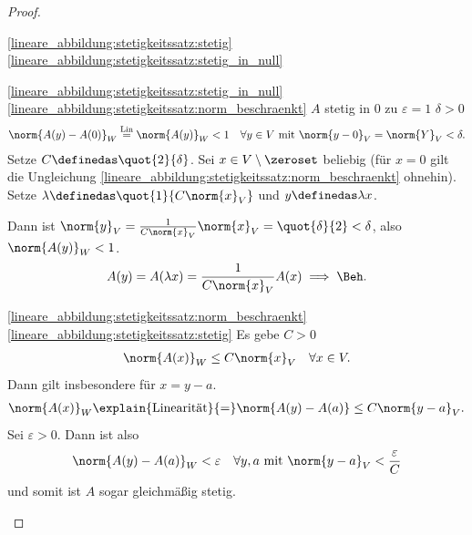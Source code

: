 \begin{proof}
    \begin{proofdescription}
        \item[\ref{lineare_abbildung:stetigkeitssatz:stetig} \timplies \ref{lineare_abbildung:stetigkeitssatz:stetig_in_null}] \checkmark
        \item[\ref{lineare_abbildung:stetigkeitssatz:stetig_in_null} \timplies \ref{lineare_abbildung:stetigkeitssatz:norm_beschraenkt}] \( A \) stetig in \( 0 \) \timplies zu \( \varepsilon=1 \) \texists \( \delta>0 \) \sd
        \begin{align*}
            \norm{A(y)-A(0)}_{W}\overset{\text{Lin}}{=}\norm{A(y)}_{W}<1\quad \forall y\in V \text{ mit }\norm{y-0}_{V}=\norm{Y}_V<\delta.
        \end{align*} 
        Setze \( C\definedas \quot{2}{\delta} \).
        Sei \( x\in V\setminus \zeroset \) beliebig (für \( x=0 \) gilt die Ungleichung \ref{lineare_abbildung:stetigkeitssatz:norm_beschraenkt} ohnehin).
        Setze \( \lambda\definedas \quot{1}{C\norm{x}_{V}} \) und \( y\definedas \lambda x \).
        
        Dann ist \( \norm{y}_V=\frac{1}{C\norm{x}_V}\norm{x}_V=\quot{\delta}{2}<\delta \), also \( \norm{A(y)}_W<1 \).
        \begin{align*}
            A(y)=A(\lambda x)=\frac{1}{C\norm{x}_V}A(x)\implies \Beh.
        \end{align*}
        \item[\ref{lineare_abbildung:stetigkeitssatz:norm_beschraenkt}\timplies \ref{lineare_abbildung:stetigkeitssatz:stetig}] Es gebe \( C>0 \) \sd
        \begin{align*}
            \norm{A(x)}_{W}\leq C\norm{x}_V \quad \forall x\in V.
        \end{align*} 
        Dann gilt insbesondere für \( x=y-a \).
        \begin{align*}
            \norm{A(x)}_{W}\explain{\text{Linearität}}{=}\norm{A(y)-A(a)}\leq C\norm{y-a}_{V}.
        \end{align*}
        Sei \( \varepsilon>0 \).
        Dann ist also
        \begin{align*}
            \norm{A(y)-A(a)}_{W}<\varepsilon\quad \forall y,a \text{ mit }\norm{y-a}_{V}<\frac{\varepsilon}{C}
        \end{align*}
        und somit ist \( A \) sogar gleichmäßig stetig.
    \end{proofdescription}    
\end{proof}
